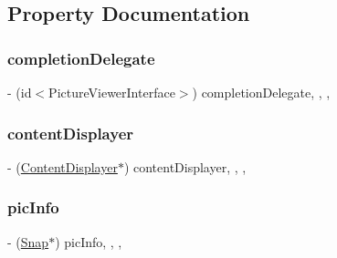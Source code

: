 \subsection{Property Documentation}
\hypertarget{interface_snap_viewer_view_controller_a96acfeda350c4bdbc6b4aafc8cd17c48}{}\label{interface_snap_viewer_view_controller_a96acfeda350c4bdbc6b4aafc8cd17c48} 
\subsubsection{\texorpdfstring{completion\+Delegate}{completionDelegate}}
{\footnotesize\ttfamily -\/ (id$<$Picture\+Viewer\+Interface$>$) completion\+Delegate\hspace{0.3cm}{\ttfamily [read]}, {\ttfamily [write]}, {\ttfamily [nonatomic]}, {\ttfamily [weak]}}

\hypertarget{interface_snap_viewer_view_controller_a098dd5e6e22df38a400ef5a3b924d983}{}\label{interface_snap_viewer_view_controller_a098dd5e6e22df38a400ef5a3b924d983} 
\subsubsection{\texorpdfstring{content\+Displayer}{contentDisplayer}}
{\footnotesize\ttfamily -\/ (\hyperlink{interface_content_displayer}{Content\+Displayer}$\ast$) content\+Displayer\hspace{0.3cm}{\ttfamily [read]}, {\ttfamily [write]}, {\ttfamily [nonatomic]}, {\ttfamily [strong]}}

\hypertarget{interface_snap_viewer_view_controller_ab20c0ba93713e93aa5456a90aafa8df1}{}\label{interface_snap_viewer_view_controller_ab20c0ba93713e93aa5456a90aafa8df1} 
\subsubsection{\texorpdfstring{pic\+Info}{picInfo}}
{\footnotesize\ttfamily -\/ (\hyperlink{interface_snap}{Snap}$\ast$) pic\+Info\hspace{0.3cm}{\ttfamily [read]}, {\ttfamily [write]}, {\ttfamily [nonatomic]}, {\ttfamily [weak]}}

